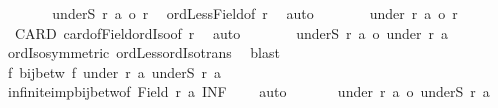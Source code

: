 \begin{isabellebody}
\ \ \ \ \isamarkupfalse%
\ \isamarkupfalse%
\ {\isachardoublequoteopen}{\isacharbar}{\kern0pt}underS\ r\ a{\isacharbar}{\kern0pt}\ {\isacharless}{\kern0pt}o\ r{\isachardoublequoteclose}\ \isamarkupfalse%
\ ordLess{\isacharunderscore}{\kern0pt}Field{\isacharbrackleft}{\kern0pt}of\ {\isacharquery}{\kern0pt}r{\isacharprime}{\kern0pt}{\isacharbrackright}{\kern0pt}\ \isamarkupfalse%
\ auto\isanewline
\ \ \ \ \isamarkupfalse%
\ \isamarkupfalse%
\ {\isachardoublequoteopen}{\isacharbar}{\kern0pt}under\ r\ a{\isacharbar}{\kern0pt}\ {\isacharequal}{\kern0pt}o\ r{\isachardoublequoteclose}\ \isamarkupfalse%
\ {\isacharasterisk}{\kern0pt}\ CARD\ card{\isacharunderscore}{\kern0pt}of{\isacharunderscore}{\kern0pt}Field{\isacharunderscore}{\kern0pt}ordIso{\isacharbrackleft}{\kern0pt}of\ r{\isacharbrackright}{\kern0pt}\ \isamarkupfalse%
\ auto\isanewline
\ \ \ \ \isamarkupfalse%
\ \isamarkupfalse%
\ {\isachardoublequoteopen}{\isacharbar}{\kern0pt}underS\ r\ a{\isacharbar}{\kern0pt}\ {\isacharless}{\kern0pt}o\ {\isacharbar}{\kern0pt}under\ r\ a{\isacharbar}{\kern0pt}{\isachardoublequoteclose}\isanewline
\ \ \ \ \isamarkupfalse%
\ ordIso{\isacharunderscore}{\kern0pt}symmetric\ ordLess{\isacharunderscore}{\kern0pt}ordIso{\isacharunderscore}{\kern0pt}trans\ \isamarkupfalse%
\ blast\isanewline
\ \ \ \ \isamarkupfalse%
\isanewline
\ \ \ \ \isacommand{{\isacharbraceleft}{\kern0pt}}\isamarkupfalse%
\isamarkupfalse%
\ {\isachardoublequoteopen}{\isasymexists}f{\isachardot}{\kern0pt}\ bij{\isacharunderscore}{\kern0pt}betw\ f\ {\isacharparenleft}{\kern0pt}under\ r\ a{\isacharparenright}{\kern0pt}\ {\isacharparenleft}{\kern0pt}underS\ r\ a{\isacharparenright}{\kern0pt}{\isachardoublequoteclose}\isanewline
\ \ \ \ \ \isamarkupfalse%
\ infinite{\isacharunderscore}{\kern0pt}imp{\isacharunderscore}{\kern0pt}bij{\isacharunderscore}{\kern0pt}betw{\isacharbrackleft}{\kern0pt}of\ {\isachardoublequoteopen}Field\ r{\isachardoublequoteclose}\ a{\isacharbrackright}{\kern0pt}\ INF\ {\isacharasterisk}{\kern0pt}\ {}\ \isamarkupfalse%
\ auto\isanewline
\ \ \ \ \ \isamarkupfalse%
\ {\isachardoublequoteopen}{\isacharbar}{\kern0pt}under\ r\ a{\isacharbar}{\kern0pt}\ {\isacharequal}{\kern0pt}o\ {\isacharbar}{\kern0pt}underS\ r\ a{\isacharbar}{\kern0pt}{\isachardoublequoteclose}\ \isamarkupfalse%

\end{isabellebody}
